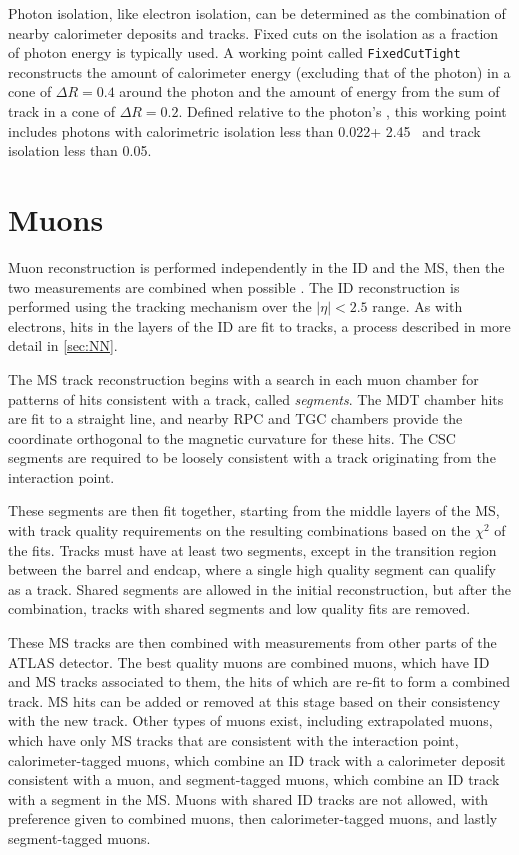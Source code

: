 Photon isolation, like electron isolation, can be determined as the combination of nearby calorimeter deposits and tracks. Fixed cuts on the isolation as a fraction of photon energy is typically used. A working point called \texttt{FixedCutTight} reconstructs the amount of calorimeter energy (excluding that of the photon) in a cone of $\Delta R  = 0.4$ around the photon and the amount of energy from the sum of track \pt in a cone of $\Delta R = 0.2$. Defined relative to the photon's \pt, this working point includes photons with calorimetric isolation less than 0.022\pt + 2.45 \gev~and track isolation less than 0.05\pt \cite{isolation}. 

\section{Muons}
\label{sec:reco_muons}

Muon reconstruction is performed independently in the \ac{ID} and the \ac{MS}, then the two measurements are combined when possible \cite{1603.05598}. The \ac{ID} reconstruction is performed using the tracking mechanism over the $|\eta|<2.5$ range. As with electrons, hits in the layers of the \ac{ID} are fit to tracks, a process described in more detail in \autoref{sec:NN}.

The \ac{MS} track reconstruction begins with a search in each muon chamber for patterns of hits consistent with a track, called \textit{segments}. The \ac{MDT} chamber hits are fit to a straight line, and nearby \ac{RPC} and \ac{TGC} chambers provide the coordinate orthogonal to the magnetic curvature for these hits. The \ac{CSC} segments are required to be loosely consistent with a track originating from the interaction point. 

These segments are then fit together, starting from the middle layers of the \ac{MS}, with track quality requirements on the resulting combinations based on the $\chi^2$ of the fits. Tracks must have at least two segments, except in the transition region between the barrel and endcap, where a single high quality segment can qualify as a track. Shared segments are allowed in the initial reconstruction, but after the combination, tracks with shared segments and low quality fits are removed.    

These \ac{MS} tracks are then combined with measurements from other parts of the ATLAS detector. The best quality muons are combined muons, which have \ac{ID} and \ac{MS} tracks associated to them, the hits of which are re-fit to form a combined track. \ac{MS} hits can be added or removed at this stage based on their consistency with the new track. Other types of muons exist, including extrapolated muons, which have only \ac{MS} tracks that are consistent with the interaction point, calorimeter-tagged muons, which combine an \ac{ID} track with a calorimeter deposit consistent with a muon, and segment-tagged muons, which combine an \ac{ID} track with a segment in the \ac{MS}. Muons with shared \ac{ID} tracks are not allowed, with preference given to combined muons, then calorimeter-tagged muons, and lastly segment-tagged muons. 

